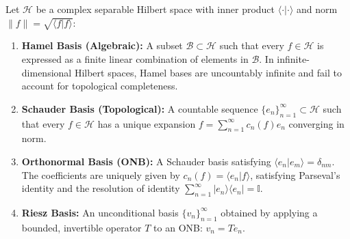 \documentclass[11pt,a4paper]{article}
\begin{document}
\begin{table}[htbp]
\centering
\caption{Systematic hierarchy of expansion systems in separable Hilbert spaces.}
\label{tab:hierarchy_table}
\end{table}

Let $\mathcal{H}$ be a complex separable Hilbert space with inner product $\langle \cdot | \cdot \rangle$ and norm $\|f\| = \sqrt{\langle f | f \rangle}$:
\begin{enumerate}
    \item \textbf{Hamel Basis (Algebraic):} A subset $\mathcal{B} \subset \mathcal{H}$ such that every $f \in \mathcal{H}$ is expressed as a finite linear combination of elements in $\mathcal{B}$. In infinite-dimensional Hilbert spaces, Hamel bases are uncountably infinite and fail to account for topological completeness.
    \item \textbf{Schauder Basis (Topological):} A countable sequence $\{e_n\}_{n=1}^\infty \subset \mathcal{H}$ such that every $f \in \mathcal{H}$ has a unique expansion $f = \sum_{n=1}^\infty c_n(f) e_n$ converging in norm.
    \item \textbf{Orthonormal Basis (ONB):} A Schauder basis satisfying $\langle e_n | e_m \rangle = \delta_{nm}$. The coefficients are uniquely given by $c_n(f) = \langle e_n | f \rangle$, satisfying Parseval's identity and the resolution of identity $\sum_{n=1}^\infty |e_n\rangle \langle e_n| = \mathbb{I}$.
    \item \textbf{Riesz Basis:} An unconditional basis $\{v_n\}_{n=1}^\infty$ obtained by applying a bounded, invertible operator $T$ to an ONB: $v_n = T e_n$.
\end{enumerate}
\end{document}
